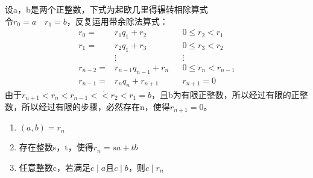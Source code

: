 \documentclass[cn,10pt]{elegantbook}
\begin{document}
\begin{theorem}[辗转相除法]
  设a，b是两个正整数，下式为起欧几里得辗转相除算式
  \\令$r_0 = a \quad r_1 = b $，反复运用带余除法算式：
  \begin{align*}
    r_0 =& r_1q_1+r_2  && 0 \leq r_2<r_1
    \\r_1 =& r_2q_1+r_3  && 0 \leq r_3<r_2
    \\&\vdots &&\vdots
    \\r_{n-2} =& r_{n-1}q_{n-1}+r_n  && 0 \leq r_n<r_{n-1}
    \\r_{n-1} =& r_{n}q_{n}+r_{n+1}  && r_{n+1} = 0
  \end{align*}
  由于$r_{n+1}<r_n<r_{n-1}<\dot <r_2<r_1 = b$，且b为有限正整数，所以经过有限的正整数，所以经过有限的步骤，必然存在n，使得$r_{n+1} = 0$。
  \begin{enumerate}[(1)]
    \item $(a,b)=r_n$
    \item 存在整数s，t，使得$r_n=sa+tb$
    \item 任意整数c，若满足$c \mid a$且$c \mid b$，则$c \mid r_n$
  \end{enumerate}
\end{theorem}
\end{document}
